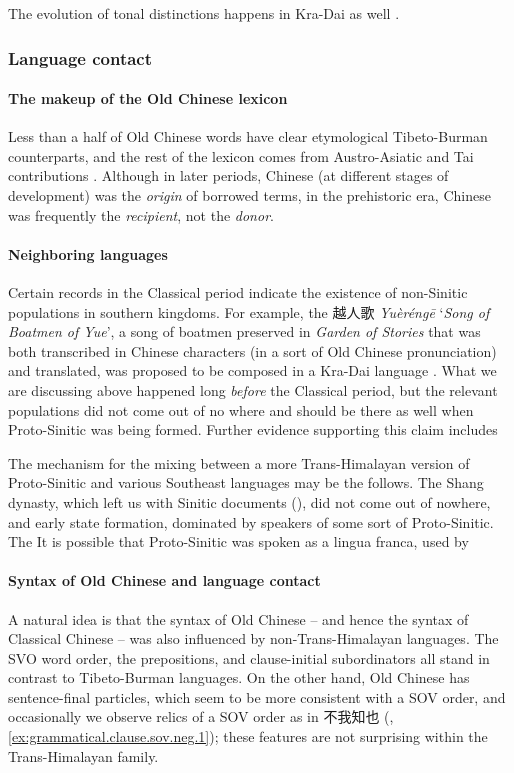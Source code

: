 \documentclass[UTF8, a4paper, oneside, scheme=plain, 12pt]{ctexrep}
\newcommand{\form}[1]{\emph{#1}}
\newcommand{\work}[1]{\textit{#1}}
\newcommand{\translate}[1]{`#1'}
\begin{document}
The evolution of tonal distinctions happens in Kra-Dai as well \citep{sagart2019model}.


\subsubsection{Language contact}\label{sec:intro.pre-history.mixing}

\paragraph*{The makeup of the Old Chinese lexicon}
Less than a half of Old Chinese words have clear etymological Tibeto-Burman counterparts,
and the rest of the lexicon comes from Austro-Asiatic and Tai contributions
\citep{mccraw2010lexical}.
Although in later periods, Chinese (at different stages of development) was the \emph{origin} of borrowed terms,
in the prehistoric era, Chinese was frequently the \emph{recipient}, not the \emph{donor}.

\paragraph*{Neighboring languages}
Certain records in the Classical period indicate the existence of non-Sinitic populations in southern kingdoms.
For example, the 越人歌 \form{Yuèréngē} \translate{\work{Song of Boatmen of Yue}},
a song of boatmen preserved in \work{Garden of Stories} that was both transcribed in Chinese characters (in a sort of Old Chinese pronunciation) and translated,
was proposed to be composed in a Kra-Dai language \citep{zhengzhang1991decipherment}.
What we are discussing above happened long \emph{before} the Classical period,
but the relevant populations did not come out of no where
and should be there as well when Proto-Sinitic was being formed.
Further evidence supporting this claim includes


The mechanism for the mixing between a more Trans-Himalayan version of Proto-Sinitic and various Southeast languages may be the follows.
The Shang dynasty, which left us with Sinitic documents (),
did not come out of nowhere,
and early state formation, dominated by speakers of some sort of Proto-Sinitic.
The 
It is possible that Proto-Sinitic was spoken as a lingua franca,
used by 

\paragraph*{Syntax of Old Chinese and language contact}
A natural idea is that the syntax of Old Chinese -- and hence the syntax of Classical Chinese -- 
was also influenced by non-Trans-Himalayan languages.
The SVO word order, the prepositions, and clause-initial subordinators all stand in contrast to Tibeto-Burman languages.
On the other hand, Old Chinese has sentence-final particles, which seem to be more consistent with a SOV order,
and occasionally we observe relics of a SOV order as in 不我知也
(, \ref{ex:grammatical.clause.sov.neg.1});
these features are not surprising within the Trans-Himalayan family.
\end{document}
